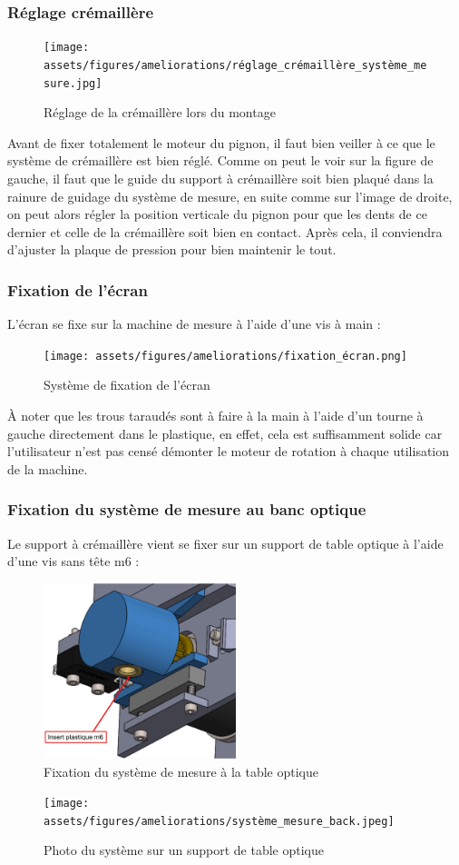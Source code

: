 \subsubsection{Réglage crémaillère}
\begin{figure}[H]
    \centering
    \texttt{[image: assets/figures/ameliorations/réglage\_crémaillère\_système\_mesure.jpg]}
    \caption{Réglage de la crémaillère lors du montage}
\end{figure}
Avant de fixer totalement le moteur du pignon, il faut bien veiller à ce que le système de crémaillère est bien réglé.
Comme on peut le voir sur la figure de gauche, il faut que le guide du support à crémaillère soit bien plaqué dans la rainure
de guidage du système de mesure, en suite comme sur l'image de droite, on peut alors régler la position verticale du pignon
pour que les dents de ce dernier et celle de la crémaillère soit bien en contact. Après cela, il conviendra d'ajuster la plaque de
pression pour bien maintenir le tout.

\subsubsection{Fixation de l'écran}
L'écran se fixe sur la machine de mesure à l'aide d'une vis à main :
\begin{figure}[H]
    \centering
    \texttt{[image: assets/figures/ameliorations/fixation\_écran.png]}
    \caption{Système de fixation de l'écran}
\end{figure}
À noter que les trous taraudés sont à faire à la main à l'aide d'un tourne à gauche directement dans le plastique, en effet,
cela est suffisamment
solide car l'utilisateur n'est pas censé démonter le moteur de rotation à chaque utilisation de la machine.

\subsubsection{Fixation du système de mesure au banc optique}
Le support à crémaillère vient se fixer sur un support de table optique à l'aide d'une vis sans tête m6 :
\begin{figure}[H]
    \centering
    \includegraphics[width = 0.5\textwidth]{assets/figures/ameliorations/fixation_table_optique.jpg}
    \caption{Fixation du système de mesure à la table optique}
\end{figure}
\begin{figure}[H]
    \centering
    \texttt{[image: assets/figures/ameliorations/système\_mesure\_back.jpeg]}
    \caption{Photo du système sur un support de table optique}
\end{figure}

